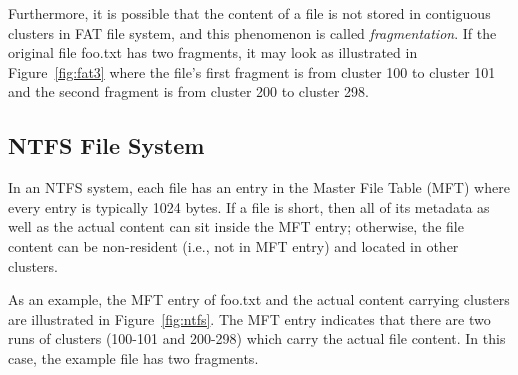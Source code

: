 \documentclass{ws-rv9x6}
\newenvironment{paraphrase}{\color{blue}}{\color{black}} %
\begin{document}
\begin{paraphrase}

Furthermore, it is possible that the content of a file is not stored in contiguous clusters in FAT file system, 
and this phenomenon is called \emph{fragmentation}.
If the original file foo.txt has two fragments, it may look as illustrated in Figure~\ref{fig:fat3} where the file's first fragment is from cluster 100 to cluster 101 and the 
second fragment is from cluster 200 to cluster 298. 

\end{paraphrase}



\subsection{NTFS File System}
\begin{paraphrase}

In an NTFS system, each file has an entry in the Master File Table (MFT) where every entry is typically 1024 bytes. 
If a file is short, then all of its metadata as well as the actual content can sit inside the MFT entry; otherwise, 
the file content can be non-resident (i.e., not in MFT entry) and located in other clusters.
  
As an example, the MFT entry of foo.txt and the actual content carrying clusters are illustrated in Figure~\ref{fig:ntfs}.
The MFT entry indicates that there are two runs of clusters (100-101 and 200-298) which carry the actual file content. 
In this case, the example file has two fragments.

 
\end{paraphrase}
\end{document}
